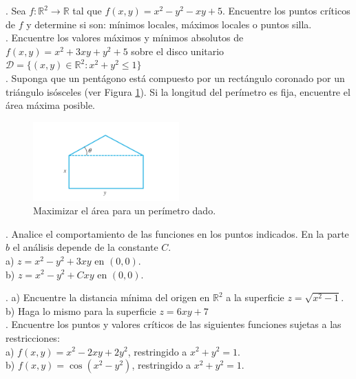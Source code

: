 \documentclass[letterpaper]{article}
\renewcommand{\*}{\cdot}
\theoremstyle{definition}
\begin{document}
. Sea $f: \mathbb{R}^2 \longrightarrow \mathbb{R}$ tal que  $f(x,y) = x^2 - y^2 - xy + 5$. Encuentre los puntos críticos de $f$ y determine si son: mínimos locales, máximos locales o puntos silla.\\

. Encuentre los valores máximos y mínimos absolutos de $f(x,y) = x^2 + 3xy + y^2 + 5$ sobre el disco unitario $\mathcal{D} = \{(x,y) \in \mathbb{R}^2 : x^2 + y^2 \leq 1 \}$\\

. Suponga que un pentágono está compuesto por un rectángulo coronado por un triángulo isósceles (ver Figura \ref{fig:1}). Si la longitud del perímetro es fija, encuentre el área máxima posible.

\begin{figure}[h]
    \centering
    \includegraphics[width=0.5\textwidth]{img/figT}
    \caption{Maximizar el área para un perímetro dado.}
    \label{fig:1}
\end{figure}


. Analice el comportamiento de las funciones en los puntos indicados. En la parte $b$ el análisis depende de la constante $C$.\\


a) $z = x^2 - y^2 + 3xy $ en $(0,0)$.\\
b)  $z = x^2 - y^2 + Cxy $ en $(0,0)$.




. a) Encuentre la distancia mínima del origen en $\mathbb{R}^2$  a la superficie $z = \sqrt{x^2 - 1}$.\\

b) Haga lo mismo para la superficie $z = 6xy + 7$\\

. Encuentre los puntos y valores críticos de las siguientes funciones sujetas a las restricciones:\\


a) $f(x,y) = x^2 - 2xy + 2y^2$, restringido a $x^2 + y^2 =1$.\\

b) $f(x,y) = \cos{(x^2 - y^2)}{}$, restringido a $x^2 + y^2 =1$.\\
\end{document}
